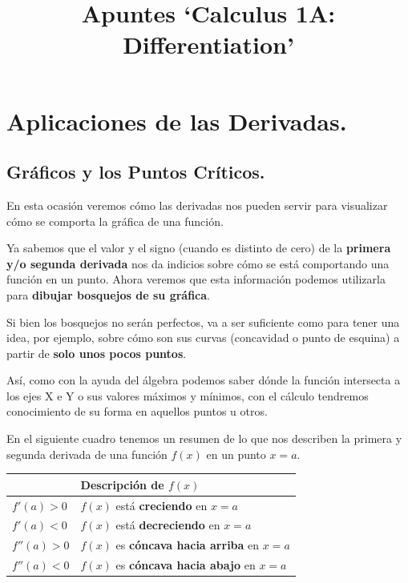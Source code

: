 \documentclass[12pt]{article}
\title{Apuntes `Calculus 1A: Differentiation'}
\author{}
\date{}
\begin{document}
\maketitle
\tableofcontents

\newpage

\section{Aplicaciones de las Derivadas.}

\subsection{Gráficos y los Puntos Críticos.}

En esta ocasión veremos cómo las derivadas nos pueden servir para visualizar cómo se comporta la gráfica de una función.

Ya sabemos que el valor y el signo (cuando es distinto de cero) de la \textbf{primera y/o segunda derivada} nos da indicios sobre cómo se está comportando una función en un punto. Ahora veremos que esta información podemos utilizarla para \textbf{dibujar bosquejos de su gráfica}.

Si bien los bosquejos no serán perfectos, va a ser suficiente como para tener una idea, por ejemplo, sobre cómo son sus curvas (concavidad o punto de esquina) a partir de \textbf{solo unos pocos puntos}.

Así, como con la ayuda del álgebra podemos saber dónde la función intersecta a los ejes X e Y o sus valores máximos y mínimos, con el cálculo tendremos conocimiento de su forma en aquellos puntos u otros.

En el siguiente cuadro tenemos un resumen de lo que nos describen la primera y segunda derivada de una función $f(x)$ en un punto $x = a$.

\begin{table}[hbt!]
\centering
{\renewcommand{\arraystretch}{1.3}
\begin{tabular}{l | l}
 & Descripción de $f(x)$ \\
\hline
$f'(a) > 0$ & $f(x)$ está \textbf{creciendo} en $x = a$ \\
$f'(a) < 0$ & $f(x)$ está \textbf{decreciendo} en $x = a$ \\
\hline
$f''(a) > 0$ & $f(x)$ es \textbf{cóncava hacia arriba} en $x = a$ \\
$f''(a) < 0$ & $f(x)$ es \textbf{cóncava hacia abajo} en $x = a$ \\
\end{tabular}
}
\end{table}
\end{document}
